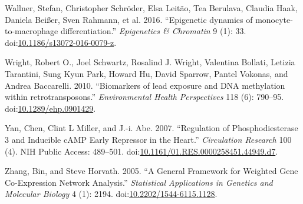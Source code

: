 \documentclass[]{article}
\theoremstyle{definition}
\theoremstyle{definition}
\theoremstyle{definition}
\theoremstyle{remark}
\begin{document}
Wallner, Stefan, Christopher Schr{ö}der, Elsa Leit{ã}o, Tea Berulava,
Claudia Haak, Daniela Bei{ß}er, Sven Rahmann, et al. 2016. ``Epigenetic
dynamics of monocyte-to-macrophage differentiation.'' \emph{Epigenetics
\& Chromatin} 9 (1): 33.
doi:\href{http://dx.doi.org/10.1186/s13072-016-0079-z}{10.1186/s13072-016-0079-z}.

Wright, Robert O., Joel Schwartz, Rosalind J. Wright, Valentina Bollati,
Letizia Tarantini, Sung Kyun Park, Howard Hu, David Sparrow, Pantel
Vokonas, and Andrea Baccarelli. 2010. ``Biomarkers of lead exposure and
DNA methylation within retrotransposons.'' \emph{Environmental Health
Perspectives} 118 (6): 790--95.
doi:\href{http://dx.doi.org/10.1289/ehp.0901429}{10.1289/ehp.0901429}.

Yan, Chen, Clint L Miller, and J.-i. Abe. 2007. ``Regulation of
Phosphodiesterase 3 and Inducible cAMP Early Repressor in the Heart.''
\emph{Circulation Research} 100 (4). NIH Public Access: 489--501.
doi:\href{http://dx.doi.org/10.1161/01.RES.0000258451.44949.d7}{10.1161/01.RES.0000258451.44949.d7}.

Zhang, Bin, and Steve Horvath. 2005. ``A General Framework for Weighted
Gene Co-Expression Network Analysis.'' \emph{Statistical Applications in
Genetics and Molecular Biology} 4 (1): 2194.
doi:\href{http://dx.doi.org/10.2202/1544-6115.1128}{10.2202/1544-6115.1128}.
\end{document}
